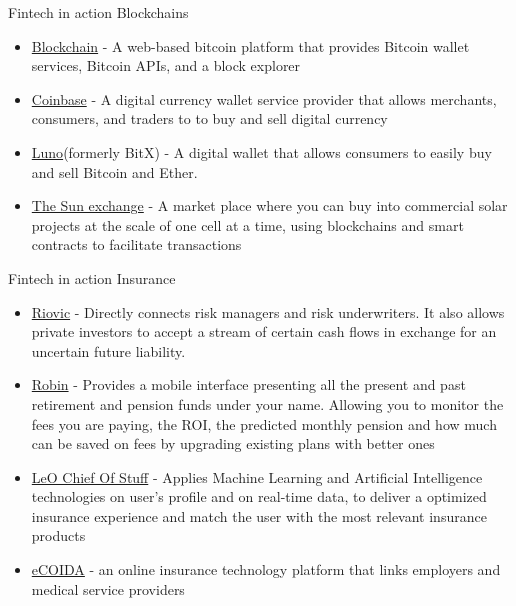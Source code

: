 \documentclass[10pt]{beamer}
\begin{document}
\begin{frame}{Fintech in action}
	Blockchains
	\begin{itemize}
		\item \href{http://blockchain.com/}{Blockchain} - A web-based bitcoin platform that provides Bitcoin wallet services, Bitcoin APIs, and a block explorer
		\item \href{https://www.coinbase.com}{Coinbase} - A digital currency wallet service provider that allows merchants, consumers, and traders to to buy and sell digital currency
		\item \href{https://www.luno.com/en/}{Luno}(formerly BitX) - A digital wallet that allows consumers to easily buy and sell Bitcoin and Ether. %
		\item \href{https://thesunexchange.com/}{The Sun exchange} - A market place where you can buy into commercial solar projects at the scale of one cell at a time, using blockchains and smart contracts to facilitate transactions
	\end{itemize}
\end{frame}



\begin{frame}{Fintech in action}
	Insurance
	\begin{itemize}
		\item \href{riovic.com/}{Riovic} - Directly connects risk managers and risk underwriters. It also allows private investors to accept a stream of certain cash flows in exchange for an uncertain future liability.
		\item \href{https://www.robinhoodpro.com}{Robin} - Provides a mobile interface presenting all the present and past retirement and pension funds under your name. Allowing you to monitor the fees you are paying, the ROI, the predicted monthly pension and how much can be saved on fees by upgrading existing plans with better ones
		\item \href{http://www.meetleo.co}{LeO Chief Of Stuff} - Applies Machine Learning and Artificial Intelligence technologies on user's profile and on real-time data, to deliver a optimized insurance experience and match the user with the most relevant insurance products
		\item \href{compsol.co.za/}{eCOIDA} - an online insurance technology platform that links employers and medical service providers
	\end{itemize}
\end{frame}
\end{document}
